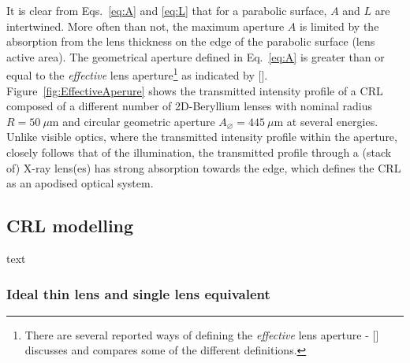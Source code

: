 \begin{refsection}
It is clear from Eqs.~\ref{eq:A} and \ref{eq:L} that for a parabolic surface, $A$ and $L$ are intertwined. More often than not, the maximum aperture $A$ is limited by the absorption from the lens thickness on the edge of the parabolic surface (lens active area). The geometrical aperture defined in Eq.~\ref{eq:A} is greater than or equal to the \textit{effective} lens aperture\footnote{There are several reported ways of defining the \textit{effective} lens aperture - [\cite{Kohn2017}] discusses and compares some of the different definitions. } as indicated by [\cite{Kohn2017}]. Figure~\ref{fig:EffectiveAperure} shows the transmitted intensity profile of a CRL composed of a different number of 2D-Beryllium lenses with nominal radius $R=50~\mu\mathrm{m}$ and circular geometric aperture $A_{\diameter}=445~ \mu\mathrm{m}$ at several energies. Unlike visible optics, where the transmitted intensity profile within the aperture, closely follows that of the illumination, the transmitted profile through a (stack of) X-ray lens(es) has strong absorption towards the edge, which defines the CRL as an apodised optical system.


\subsection{CRL modelling}\label{sec:CRL_modelling}
text
\subsubsection*{Ideal thin lens and single lens equivalent}


\end{refsection}
